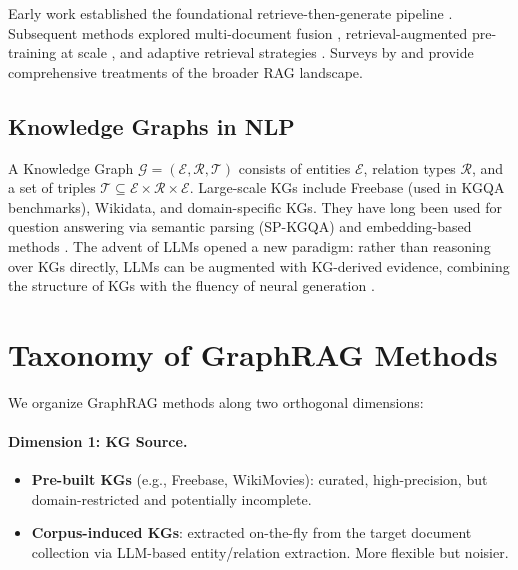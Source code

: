 \documentclass[11pt]{article}
\begin{document}
Early work established the foundational retrieve-then-generate pipeline \cite{lewis2020rag,guu2020realm}. Subsequent methods explored multi-document fusion \cite{izacard2021fid}, retrieval-augmented pre-training at scale \cite{borgeaud2022retro,izacard2022atlas}, and adaptive retrieval strategies \cite{asai2024selfrag,jeong2024adaptiverag}. Surveys by \citet{gao2023ragsurvey} and \citet{gao2024modularrag} provide comprehensive treatments of the broader RAG landscape.

\subsection{Knowledge Graphs in NLP}

A Knowledge Graph $\mathcal{G} = (\mathcal{E}, \mathcal{R}, \mathcal{T})$ consists of entities $\mathcal{E}$, relation types $\mathcal{R}$, and a set of triples $\mathcal{T} \subseteq \mathcal{E} \times \mathcal{R} \times \mathcal{E}$. Large-scale KGs include Freebase (used in KGQA benchmarks), Wikidata, and domain-specific KGs. They have long been used for question answering via semantic parsing (SP-KGQA) and embedding-based methods \cite{saxena2020embedkgqa,jiang2023unikgqa}. The advent of LLMs opened a new paradigm: rather than reasoning over KGs directly, LLMs can be augmented with KG-derived evidence, combining the structure of KGs with the fluency of neural generation \cite{pan2024kgllmsurvey}.

\section{Taxonomy of GraphRAG Methods}
\label{sec:taxonomy}

We organize GraphRAG methods along two orthogonal dimensions:

\paragraph{Dimension 1: KG Source.}
\begin{itemize}
  \item \textbf{Pre-built KGs} (e.g., Freebase, WikiMovies): curated, high-precision, but domain-restricted and potentially incomplete.
  \item \textbf{Corpus-induced KGs}: extracted on-the-fly from the target document collection via LLM-based entity/relation extraction. More flexible but noisier.
\end{itemize}
\end{document}
